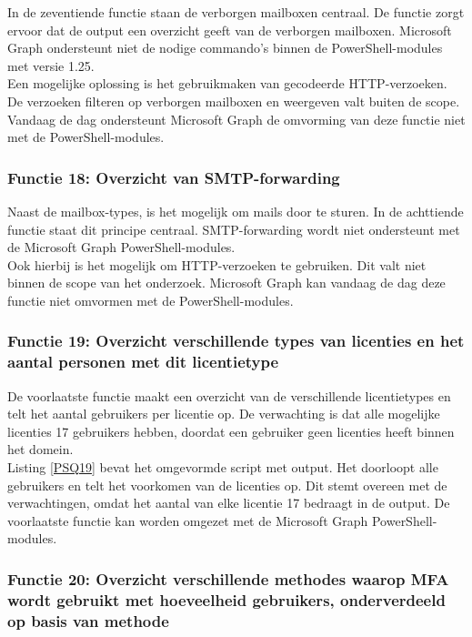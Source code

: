 In de zeventiende functie staan de verborgen mailboxen centraal. De functie zorgt ervoor dat de output een overzicht geeft van de verborgen mailboxen. Microsoft Graph ondersteunt niet de nodige commando's binnen de PowerShell-modules met versie 1.25. \\ 

Een mogelijke oplossing is het gebruikmaken van gecodeerde \ac{HTTP}-verzoeken. De verzoeken filteren op verborgen mailboxen en weergeven valt buiten de scope. Vandaag de dag ondersteunt Microsoft Graph de omvorming van deze functie niet met de PowerShell-modules.

\subsubsection{Functie 18: Overzicht van SMTP-forwarding}

Naast de mailbox-types, is het mogelijk om mails door te sturen. In de achttiende functie staat dit principe centraal. \Ac{SMTP}-forwarding wordt niet ondersteunt met de Microsoft Graph PowerShell-modules. \\

Ook hierbij is het mogelijk om \Ac{HTTP}-verzoeken te gebruiken. Dit valt niet binnen de scope van het onderzoek. Microsoft Graph kan vandaag de dag deze functie niet omvormen met de PowerShell-modules.

\subsubsection{Functie 19: Overzicht verschillende types van licenties en het aantal personen met dit licentietype}

De voorlaatste functie maakt een overzicht van de verschillende licentietypes en telt het aantal gebruikers per licentie op. De verwachting is dat alle mogelijke licenties 17 gebruikers hebben, doordat een gebruiker geen licenties heeft binnen het domein. \\

Listing \ref{PSQ19} bevat het omgevormde script met output. Het doorloopt alle gebruikers en telt het voorkomen van de licenties op. Dit stemt overeen met de verwachtingen, omdat het aantal van elke licentie 17 bedraagt in de output. De voorlaatste functie kan worden omgezet met de Microsoft Graph PowerShell-modules.

\subsubsection{Functie 20: Overzicht verschillende methodes waarop MFA wordt gebruikt met hoeveelheid gebruikers, onderverdeeld op basis van methode}

